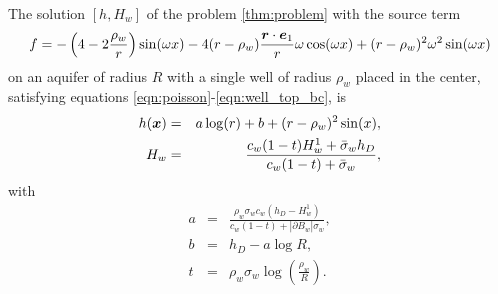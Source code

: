 \begin{thmdef}
The solution $[h,H_w]$ of the problem \ref{thm:problem}
with the source term
\begin{equation} 
  f = -\left(4 - 2 \frac{\rho_w}{r} \right) \sin(\omega x)      
                    - 4(r-\rho_w)\frac{\mathbf{\boldsymbol{r}}\cdot\mathbf{\boldsymbol{e}}_1}{r} \omega\cos(\omega x)
                    + (r-\rho_w)^2\omega^2\sin(\omega x)
\end{equation}
on an aquifer of radius $R$ with a single well of radius $\rho_w$ placed in the center, 
satisfying equations \eqref{eqn:poisson}-\eqref{eqn:well_top_bc}, is
\begin{eqnarray}
  h(\mathbf{\boldsymbol{x}}) &=& a\log(r) + b + (r-\rho_w)^2 \sin(x), \\
  H_w &=& \frac{c_w(1-t) H^1_w + \bar{\sigma}_w h_D}{c_w(1-t) + \bar{\sigma}_w},
\end{eqnarray}
with
\begin{eqnarray}
  a &=& \frac{\rho_w\sigma_w c_w (h_D-H^1_w)}{c_w(1-t) + |\partial B_w|\sigma_w}, \nonumber \\
  b &=& h_D - a\log R, \nonumber \\
  t &=& \rho_w\sigma_w\log\left(\frac{\rho_w}{R}\right). \nonumber
\end{eqnarray}
\end{thmdef}



  
 

